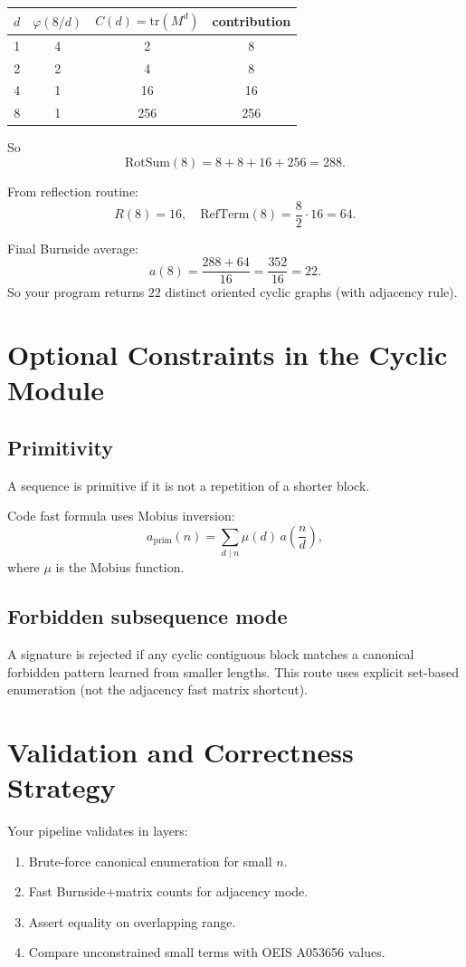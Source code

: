 \documentclass[12pt]{article}
\theoremstyle{definition}
\begin{document}
\begin{center}
\begin{tabular}{cccc}
\toprule
\(d\) & \(\varphi(8/d)\) & \(C(d)=\mathrm{tr}(M^d)\) & contribution \\
\midrule
1 & 4 & 2   & 8   \\
2 & 2 & 4   & 8   \\
4 & 1 & 16  & 16  \\
8 & 1 & 256 & 256 \\
\bottomrule
\end{tabular}
\end{center}

So
\[
\text{RotSum}(8)=8+8+16+256=288.
\]

From reflection routine:
\[
R(8)=16,
\quad
\text{RefTerm}(8)=\frac{8}{2}\cdot16=64.
\]

Final Burnside average:
\[
a(8)=\frac{288+64}{16}=\frac{352}{16}=22.
\]
So your program returns \(22\) distinct oriented cyclic graphs (with adjacency rule).

\section{Optional Constraints in the Cyclic Module}
\subsection{Primitivity}
A sequence is primitive if it is not a repetition of a shorter block.

Code fast formula uses Mobius inversion:
\[
a_{\mathrm{prim}}(n)=\sum_{d\mid n}\mu(d)\,a\!\left(\frac{n}{d}\right),
\]
where \(\mu\) is the Mobius function.

\subsection{Forbidden subsequence mode}
A signature is rejected if any cyclic contiguous block matches a canonical forbidden pattern learned from smaller lengths. This route uses explicit set-based enumeration (not the adjacency fast matrix shortcut).

\section{Validation and Correctness Strategy}
Your pipeline validates in layers:
\begin{enumerate}
    \item Brute-force canonical enumeration for small \(n\).
    \item Fast Burnside+matrix counts for adjacency mode.
    \item Assert equality on overlapping range.
    \item Compare unconstrained small terms with OEIS A053656 values.
\end{enumerate}
\end{document}
